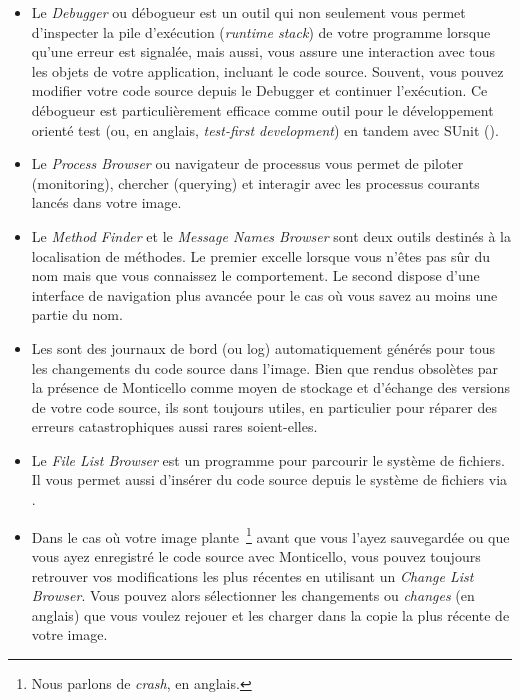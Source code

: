 \documentclass[a4paper,10pt,twoside]{book}
\begin{document}
\begin{itemize}
(bouton de droite) de la souris pour afficher leur \emph{halo}
et en s\'electionnant l'ic\^one
\emph{debug}
\debugHandle .
  \item Le \emph{Debugger} ou d\'ebogueur est un outil qui non seulement vous permet
d'inspecter la pile d'ex\'ecution (\emph{runtime stack}) de votre
programme lorsque qu'une erreur est signal\'ee, mais aussi, 
vous assure une interaction avec tous les objets de votre application,
incluant le code source. Souvent, vous pouvez modifier votre 
code source depuis le Debugger et continuer l'ex\'ecution.
Ce d\'ebogueur est particuli\`erement efficace comme outil pour
le d\'eveloppement orient\'e test (ou, en anglais, \emph{test-first development}) en tandem
avec 
SUnit ().
  \item Le \emph{Process Browser} ou navigateur de processus vous permet de piloter (monitoring), chercher (querying) et interagir avec les processus courants lanc\'es dans votre image.
  \item Le \emph{Method Finder} et le \emph{Message Names Browser} sont 
deux outils destin\'es \`a la localisation de m\'ethodes. Le
premier excelle lorsque vous n'\^etes pas s\^ur du nom mais que vous
connaissez le comportement.
Le second dispose d'une interface de navigation plus avanc\'ee pour le cas o\`u
vous savez au moins une partie du nom.
  \item Les \changesets sont des journaux de bord (ou log) automatiquement g\'en\'er\'es pour tous les changements du code source dans l'image.
Bien que rendus obsol\`etes par la pr\'esence de Monticello comme
moyen de stockage et d'\'echange des versions de votre code source,
ils sont toujours utiles, en particulier pour r\'eparer des erreurs
catastrophiques aussi rares soient-elles.
  \item Le \emph{File List Browser} est un programme pour parcourir le
syst\`eme de fichiers. Il vous permet aussi d'ins\'erer du code
source depuis le syst\`eme de fichiers via .
  \item Dans le cas o\`u votre image plante~\footnote{Nous parlons de \emph{crash}, en anglais.} avant que
vous l'ayez sauvegard\'ee ou que vous ayez enregistr\'e le code source
avec Monticello, vous pouvez toujours retrouver vos modifications les
plus r\'ecentes en utilisant un \emph{Change List Browser}. 
Vous pouvez alors s\'electionner les changements ou \emph{changes} (en anglais) que vous voulez rejouer et les charger dans la copie la plus r\'ecente de votre image.
\end{itemize}

\ifx\wholebook\relax\else
\end{document}
